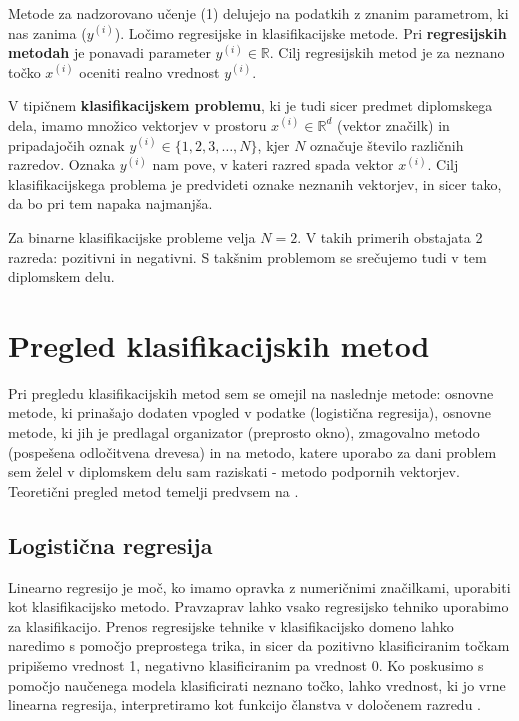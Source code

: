 \documentclass[11pt,a4paper,openany]{book}
\begin{document}
Metode za nadzorovano učenje (1) delujejo na podatkih z znanim parametrom, ki nas zanima ($y^{(i)}$). Ločimo regresijske in klasifikacijske metode. Pri \textbf{regresijskih metodah} je ponavadi parameter $y^{(i)} \in \mathbb{R}$. Cilj regresijskih metod je za neznano točko $x^{(i)}$ oceniti realno vrednost $y^{(i)}$. 

V tipičnem \textbf{klasifikacijskem problemu}, ki je tudi sicer predmet diplomskega dela, imamo množico vektorjev v prostoru $x^{(i)} \in \mathbb{R}^d$ (vektor značilk) in pripadajočih oznak $y^{(i)} \in \{1, 2, 3, \ldots, N\}$, kjer $N$ označuje število različnih razredov. Oznaka $y^{(i)}$ nam pove, v kateri razred spada vektor $x^{(i)}$. Cilj klasifikacijskega problema je predvideti oznake neznanih vektorjev, in sicer tako, da bo pri tem napaka najmanjša.

Za binarne klasifikacijske probleme velja $N = 2$. V takih primerih obstajata 2 razreda: pozitivni in negativni. S takšnim problemom se srečujemo tudi v tem diplomskem delu.


\section{Pregled klasifikacijskih metod}

Pri pregledu klasifikacijskih metod sem se omejil na naslednje metode: osnovne metode, ki prinašajo dodaten vpogled v podatke (logistična regresija), osnovne metode, ki jih je predlagal organizator (preprosto okno), zmagovalno metodo (pospešena odločitvena drevesa) in na metodo, katere uporabo za dani problem sem želel v diplomskem delu sam raziskati - metodo podpornih vektorjev. Teoretični pregled metod temelji predvsem na \cite{AndrewNgML}.


\subsection{Logistična regresija}

Linearno regresijo je moč, ko imamo opravka z numeričnimi značilkami, uporabiti kot klasifikacijsko metodo. Pravzaprav lahko vsako regresijsko tehniko uporabimo za klasifikacijo. Prenos regresijske tehnike v klasifikacijsko domeno lahko naredimo s pomočjo preprostega trika, in sicer da pozitivno klasificiranim točkam pripišemo vrednost 1, negativno klasificiranim pa vrednost 0. Ko poskusimo s pomočjo naučenega modela klasificirati neznano točko, lahko vrednost, ki jo vrne linearna regresija, interpretiramo kot funkcijo članstva v določenem razredu \cite{Witten2005}.
\end{document}
